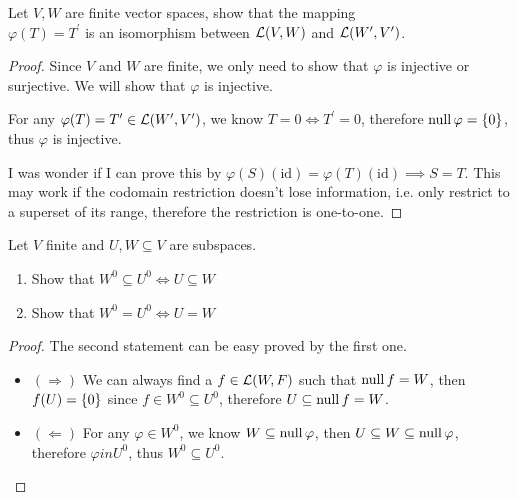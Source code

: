 \documentclass[../main.tex]{subfiles}
\begin{document}
\begin{exercise}
  Let $V, W$ are finite vector spaces, show that the mapping \\ 
  $\varphi(T) = T^\prime$ is an isomorphism between $\mathcal{L}(V, W)$ and $\mathcal{L}(W^\prime, V^\prime)$.
\end{exercise}
\begin{proof}
  Since $V$ and $W$ are finite, we only need to show that $\varphi$ is injective or surjective.
  We will show that $\varphi$ is injective.

  For any $\varphi(T) = T^\prime \in \mathcal{L}(W^\prime, V^\prime)$, we know $T = 0 \iff T^\prime = 0$,
  therefore $\operatorname{null} \varphi = \{0\}$, thus $\varphi$ is injective.

  I was wonder if I can prove this by $\varphi(S)(\mathrm{id}) = \varphi(T)(\mathrm{id}) \implies S = T$.
  This may work if the codomain restriction doesn't lose information, i.e. only restrict to a superset of its range, therefore the restriction is one-to-one.
\end{proof}

\setcounter{exercise}{20}
\begin{exercise}
  Let $V$ finite and $U, W \subseteq V$ are subspaces.
  \begin{enumerate}
    \item Show that $W^0 \subseteq U^0 \iff U \subseteq W$
    \item Show that $W^0 = U^0 \iff U = W$
  \end{enumerate}
\end{exercise}
\begin{proof}
  The second statement can be easy proved by the first one.
  \begin{itemize}
    \item $(\Rightarrow)$ We can always find a $f \in \mathcal{L}(W, F)$ such that $\operatorname{null} f = W$,
          then $f(U) = \{0\}$ since $f \in W^0 \subseteq U^0$, therefore $U \subseteq \operatorname{null} f = W$.
    \item $(\Leftarrow)$ For any $\varphi \in W^0$, we know $W \subseteq \operatorname{null} \varphi$,
          then $U \subseteq W \subseteq \operatorname{null} \varphi$, therefore $\varphi in U^0$,
          thus $W^0 \subseteq U^0$.
  \end{itemize}
\end{proof}
\end{document}
